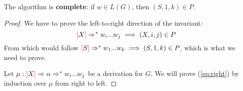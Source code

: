 \documentclass[main.tex]{subfiles}
\begin{document}
\begin{prop}
    The algorithm is \textbf{complete}: if $w \in L(G)$, then $(S, 1, k) \in P$.
\end{prop}
\begin{proof}
    We have to prove the left-to-right direction of the invariant:
    \begin{equation}\label{eq:right}
        \textcolor{red}{[} X \textcolor{red}{]} \Rightarrow^* w_i ... w_j \implies (X, i, j) \in P
    \end{equation}
    From which would follow $ \textcolor{red}{[} S \textcolor{red}{]} \Rightarrow^* w_1 ... w_k \implies (S, 1, k) \in P$,
    which is what we need to prove.

    Let $\mu: \textcolor{red}{[} X \textcolor{red}{]} \Rightarrow \alpha \Rightarrow^* w_i ... w_j$
    be a derivation for $G$. We will prove (\ref{eq:right}) by induction over
    $\mu$ from right to left.


\end{proof}
\end{document}
